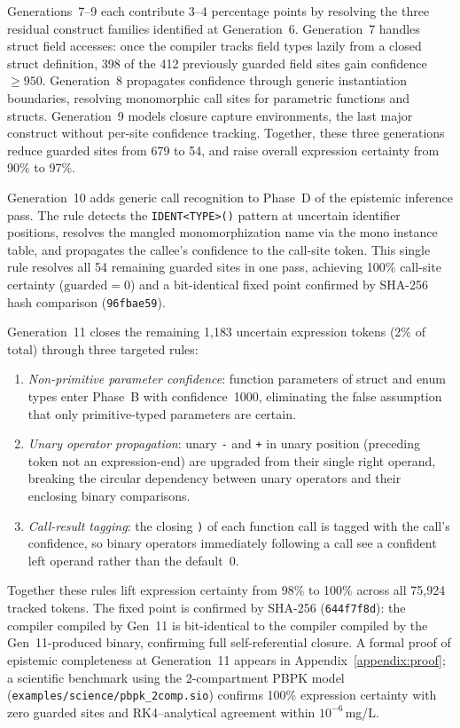 \documentclass[acmsmall,screen,review,anonymous]{acmart}
\begin{document}
Generations~7--9 each contribute 3--4 percentage points by resolving
the three residual construct families identified at Generation~6.
Generation~7 handles struct field accesses: once the compiler tracks
field types lazily from a closed struct definition, 398 of the 412
previously guarded field sites gain confidence~$\geq 950$.
Generation~8 propagates confidence through generic instantiation
boundaries, resolving monomorphic call sites for parametric functions
and structs.
Generation~9 models closure capture environments, the last major
construct without per-site confidence tracking.
Together, these three generations reduce guarded sites from 679 to 54,
and raise overall expression certainty from 90\% to 97\%.

Generation~10 adds generic call recognition to Phase~D of the epistemic
inference pass.
The rule detects the \texttt{IDENT\textless TYPE\textgreater()} pattern at
uncertain identifier positions, resolves the mangled monomorphization name
via the mono instance table, and propagates the callee's confidence to the
call-site token.
This single rule resolves all 54 remaining guarded sites in one pass,
achieving 100\% call-site certainty ($\text{guarded} = 0$) and a
bit-identical fixed point confirmed by SHA-256 hash comparison
(\texttt{96fbae59}).

Generation~11 closes the remaining 1,183 uncertain expression tokens
(2\% of total) through three targeted rules:
\begin{enumerate}
\item \emph{Non-primitive parameter confidence}: function parameters of
struct and enum types enter Phase~B with confidence~1000, eliminating the
false assumption that only primitive-typed parameters are certain.
\item \emph{Unary operator propagation}: unary \texttt{-} and \texttt{+}
in unary position (preceding token not an expression-end) are upgraded
from their single right operand, breaking the circular dependency between
unary operators and their enclosing binary comparisons.
\item \emph{Call-result tagging}: the closing \texttt{)} of each function
call is tagged with the call's confidence, so binary operators immediately
following a call see a confident left operand rather than the default~0.
\end{enumerate}
Together these rules lift expression certainty from 98\% to 100\%
across all 75,924 tracked tokens.
The fixed point is confirmed by SHA-256 (\texttt{644f7f8d}): the
compiler compiled by Gen~11 is bit-identical to the compiler compiled
by the Gen~11-produced binary, confirming full self-referential closure.
A formal proof of epistemic completeness at Generation~11 appears in
Appendix~\ref{appendix:proof}; a scientific benchmark using the
2-compartment PBPK model (\texttt{examples/science/pbpk\_2comp.sio})
confirms 100\% expression certainty with zero guarded sites and
RK4--analytical agreement within $10^{-6}$\,mg/L.
\end{document}
